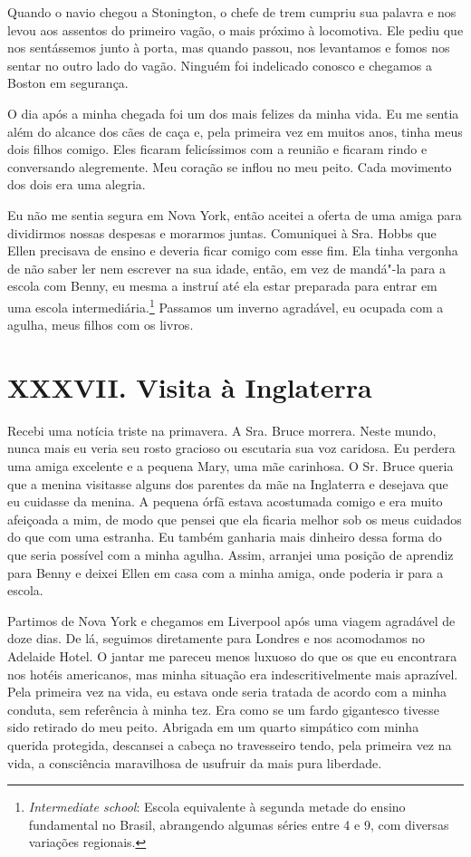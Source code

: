 Quando o navio chegou a Stonington, o
chefe de trem cumpriu sua palavra e nos levou aos assentos do primeiro
vagão, o mais próximo à locomotiva. Ele pediu que nos sentássemos junto
à porta, mas quando passou, nos levantamos e fomos nos sentar no outro
lado do vagão. Ninguém foi indelicado conosco e chegamos a Boston em
segurança.

O dia após a minha chegada foi um dos
mais felizes da minha vida. Eu me sentia além do alcance dos cães de
caça e, pela primeira vez em muitos anos, tinha meus dois filhos comigo.
Eles ficaram felicíssimos com a reunião e ficaram rindo e conversando
alegremente. Meu coração se inflou no meu peito. Cada movimento dos dois
era uma alegria.

Eu não me sentia segura em Nova York,
então aceitei a oferta de uma amiga para dividirmos nossas despesas e
morarmos juntas. Comuniquei à Sra. Hobbs que Ellen precisava de ensino e
deveria ficar comigo com esse fim. Ela tinha vergonha de não saber ler
nem escrever na sua idade, então, em vez de mandá"-la para a escola com
Benny, eu mesma a instruí até ela estar preparada para entrar em uma
escola intermediária.\footnote{\emph{Intermediate school}: Escola
  equivalente à segunda metade do ensino fundamental no Brasil,
  abrangendo algumas séries entre 4 e 9, com diversas variações
  regionais.} Passamos um inverno agradável, eu ocupada com a agulha,
meus filhos com os livros.

\chapter{XXXVII. Visita à
Inglaterra}

Recebi uma notícia triste na primavera.
A Sra. Bruce morrera. Neste mundo, nunca mais eu veria seu rosto
gracioso ou escutaria sua voz caridosa. Eu perdera uma amiga excelente e
a pequena Mary, uma mãe carinhosa. O Sr. Bruce queria que a menina
visitasse alguns dos parentes da mãe na Inglaterra e desejava que eu
cuidasse da menina. A pequena órfã estava acostumada comigo e era muito
afeiçoada a mim, de modo que pensei que ela ficaria melhor sob os meus
cuidados do que com uma estranha. Eu também ganharia mais dinheiro dessa
forma do que seria possível com a minha agulha. Assim, arranjei uma
posição de aprendiz para Benny e deixei Ellen em casa com a minha amiga,
onde poderia ir para a escola.

Partimos de Nova York e chegamos em
Liverpool após uma viagem agradável de doze dias. De lá, seguimos
diretamente para Londres e nos acomodamos no Adelaide Hotel. O jantar me
pareceu menos luxuoso do que os que eu encontrara nos hotéis americanos,
mas minha situação era indescritivelmente mais aprazível. Pela primeira
vez na vida, eu estava onde seria tratada de acordo com a minha conduta,
sem referência à minha tez. Era como se um fardo gigantesco tivesse sido
retirado do meu peito. Abrigada em um quarto simpático com minha querida
protegida, descansei a cabeça no travesseiro tendo, pela primeira vez na
vida, a consciência maravilhosa de usufruir da mais pura liberdade.


